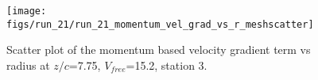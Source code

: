 \begin{figure}[H]
\centering
\texttt{[image: figs/run\_21/run\_21\_momentum\_vel\_grad\_vs\_r\_meshscatter]}
\caption{Scatter plot of the momentum based velocity gradient term vs radius at $z/c$=7.75, $V_{free}$=15.2, station 3.}
\label{fig:run_21_momentum_vel_grad_vs_r_meshscatter}
\end{figure}


